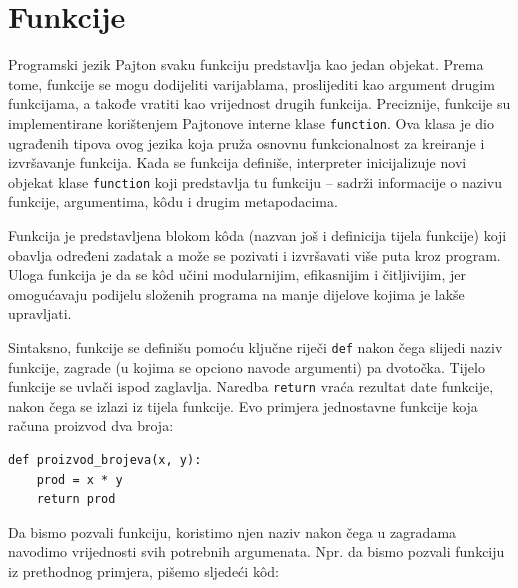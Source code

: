
\section{Funkcije}

Programski jezik Pajton svaku funkciju predstavlja kao jedan objekat. Prema tome, funkcije se mogu dodijeliti varijablama, proslijediti kao argument  drugim funkcijama, a takođe vratiti kao vrijednost    drugih funkcija.  Preciznije, funkcije su implementirane korištenjem Pajtonove interne klase  \texttt{function}. Ova klasa je dio ugrađenih tipova ovog jezika koja pruža osnovnu funkcionalnost za kreiranje i izvršavanje funkcija. Kada se funkcija definiše, interpreter inicijalizuje novi objekat klase \texttt{function} koji predstavlja tu funkciju -- sadrži informacije o nazivu funkcije, argumentima, k\^odu i drugim metapodacima.

Funkcija je predstavljena blokom k\^oda (nazvan još i definicija tijela funkcije) koji obavlja određeni zadatak a može se pozivati i izvršavati više puta kroz program. Uloga funkcija je da se k\^od učini modularnijim, efikasnijim i čitljivijim, jer omogućavaju  podijelu složenih programa na manje dijelove kojima je lakše upravljati.

Sintaksno, funkcije se definišu pomoću ključne riječi \texttt{def} nakon čega slijedi naziv funkcije, zagrade (u kojima se opciono navode argumenti) pa dvotočka. Tijelo funkcije se uvlači ispod zaglavlja. Naredba \texttt{return} vraća rezultat date funkcije, nakon čega se izlazi iz tijela funkcije. Evo primjera jednostavne funkcije koja računa proizvod dva broja:

\begin{verbatim}
def proizvod_brojeva(x, y):
    prod = x * y
    return prod
\end{verbatim}

Da bismo pozvali funkciju, koristimo njen naziv nakon čega u zagradama navodimo vrijednosti svih potrebnih argumenata. Npr. da bismo pozvali funkciju iz prethodnog primjera, pišemo sljedeći k\^od:

